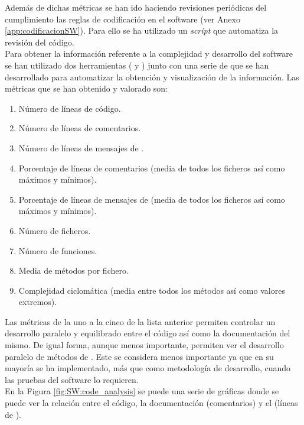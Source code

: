     Además de dichas métricas se han ido haciendo revisiones periódicas del cumplimiento las reglas de codificación en el software (ver Anexo \ref{app:codificacionSW}). Para ello se ha utilizado un \textit{script}  que automatiza la revisión del código.
    \\

    Para obtener la información referente a la complejidad y desarrollo del software se han utilizado dos herramientas ( y ) junto con una serie de  que se han desarrollado para automatizar la obtención y visualización de la información. Las métricas que se han obtenido y valorado son:

    \begin{enumerate}
        \item Número de líneas de código.
        \item Número de líneas de comentarios.
        \item Número de líneas de mensajes de .
        \item Porcentaje de líneas de comentarios (media de todos los ficheros así como máximos y mínimos).
        \item Porcentaje de líneas de mensajes de  (media de todos los ficheros así como máximos y mínimos).
        \item Número de ficheros.
        \item Número de funciones.
        \item Media de métodos por fichero.
        \item Complejidad ciclomática  (media entre todos los métodos así como valores extremos).
    \end{enumerate}

    Las métricas de la uno a la cinco de la lista anterior permiten controlar un desarrollo paralelo y equilibrado entre el código así como la documentación del mismo. De igual forma, aunque menos importante, permiten ver el desarrollo paralelo de métodos de . Este se considera menos importante ya que en su mayoría se ha implementado, más que como metodología de desarrollo, cuando las pruebas del software lo requieren.
    \\

    En la Figura \ref{fig:SW:code_analysis} se puede una serie de gráficas donde se puede ver la relación entre el código, la documentación (comentarios) y el  (líneas de ).

